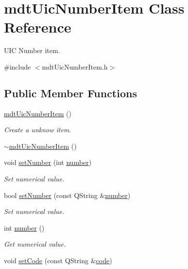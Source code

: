 \hypertarget{classmdt_uic_number_item}{\section{mdt\-Uic\-Number\-Item Class Reference}
\label{classmdt_uic_number_item}
}


U\-I\-C Number item.  




{\ttfamily \#include $<$mdt\-Uic\-Number\-Item.\-h$>$}

\subsection*{Public Member Functions}
\begin{DoxyCompactItemize}
\item 
\hyperlink{classmdt_uic_number_item_a119fb789d9a5755b0243b3c4d1cab811}{mdt\-Uic\-Number\-Item} ()
\begin{DoxyCompactList}\small\item\em Create a unknow item. \end{DoxyCompactList}\item 
\hyperlink{classmdt_uic_number_item_ad2bbf5a57cd6a6a9ffa6b5820b20b319}{$\sim$mdt\-Uic\-Number\-Item} ()
\item 
void \hyperlink{classmdt_uic_number_item_ab1388f9d35e67c76bde96c522ba7388b}{set\-Number} (int \hyperlink{classmdt_uic_number_item_a23c0a0e1c9f20bc3e092a51a1eabbffc}{number})
\begin{DoxyCompactList}\small\item\em Set numerical value. \end{DoxyCompactList}\item 
bool \hyperlink{classmdt_uic_number_item_a7880c90310850a42deaf38dbc8d91bbd}{set\-Number} (const Q\-String \&\hyperlink{classmdt_uic_number_item_a23c0a0e1c9f20bc3e092a51a1eabbffc}{number})
\begin{DoxyCompactList}\small\item\em Set numerical value. \end{DoxyCompactList}\item 
int \hyperlink{classmdt_uic_number_item_a23c0a0e1c9f20bc3e092a51a1eabbffc}{number} ()
\begin{DoxyCompactList}\small\item\em Get numerical value. \end{DoxyCompactList}\item 
void \hyperlink{classmdt_uic_number_item_a8c3a5faea122cdbaadf026b0a64ce59b}{set\-Code} (const Q\-String \&\hyperlink{classmdt_uic_number_item_a43652b0e8b1685b5d9890d175b42dc75}{code})

\end{DoxyCompactItemize}
